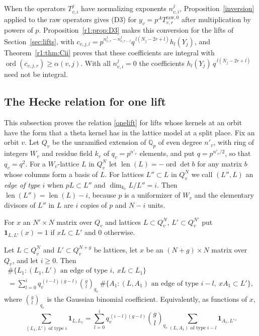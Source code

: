 When the operators $T^j_{v,i}$ have normalizing exponents $n^j_{v,i}$, Proposition~\ref{inversion} applied to the raw operators gives (D3) for $y_v=p^{A}T^{\mathrm{raw},0}_{v,r}$ after multiplication by powers of $p$. Proposition~\ref{r1:prop:D3} makes this conversion for the lifts of Section~\ref{sec:lifts}, with $c_{v,j,l}=p^{n^j_{v,r}-n^j_{v,r-l}}q^{\,l(N_j-2r+l)}h_l(Y_j)$, and Theorem~\ref{r1:thm:Cii} proves that these coefficients are integral with $\operatorname{ord}(c_{v,j,r})\ge\alpha(v,j)$. With all $n^j_{v,i}=0$ the coefficients $h_l(Y_j)\,q^{\,l(N_j-2r+l)}$ need not be integral.

\subsection{The Hecke relation for one lift}\label{sec:onelift}

This subsection proves the relation \eqref{onelift} for lifts whose kernels at an orbit have the form that a theta kernel has in the lattice model at a split place. Fix an orbit $v$. Let $Q_v$ be the unramified extension of $\mathbb Q_p$ of even degree $n'_v$, with ring of integers $W_v$ and residue field $k_v$ of $q_v=p^{n'_v}$ elements, and put $q=p^{n'_v/2}$, so that $q_v=q^2$. For a $W_v$-lattice $L$ in $Q_v^N$ let $\operatorname{len}(L)=-\operatorname{ord}\det b$ for any matrix $b$ whose columns form a basis of $L$. For lattices $L''\subset L$ in $Q_v^N$ we call $(L'',L)$ an \emph{edge of type $i$} when $pL\subset L''$ and $\dim_{k_v}L/L''=i$. Then $\operatorname{len}(L'')=\operatorname{len}(L)-i$, because $p$ is a uniformizer of $W_v$ and the elementary divisors of $L''$ in $L$ are $i$ copies of $p$ and $N-i$ units.

For $x$ an $N'\times N$ matrix over $Q_v$ and lattices $L\subset Q_v^N$, $L'\subset Q_v^{N'}$ put $\mathbf 1_{L,L'}(x)=1$ if $xL\subset L'$ and $0$ otherwise.

\begin{lemma}\label{countloc}
Let $L\subset Q_v^N$ and $L'\subset Q_v^{N+g}$ be lattices, let $x$ be an $(N+g)\times N$ matrix over $Q_v$, and let $i\ge0$. Then
\begin{multline*}
\#\big\{L_1:(L_1,L')\text{ an edge of type }i,\ xL\subset L_1\big\}\\
=\sum_{l=0}^{i}q_v^{\,(i-l)(g-l)}\binom gl_{q_v}\,\#\big\{A_1:(L,A_1)\text{ an edge of type }i-l,\ xA_1\subset L'\big\},
\end{multline*}
where $\binom gl_{q_v}$ is the Gaussian binomial coefficient. Equivalently, as functions of $x$,
\[
\sum_{(L_1,L')\text{ of type }i}\mathbf 1_{L,L_1}=\sum_{l=0}^iq_v^{\,(i-l)(g-l)}\binom gl_{q_v}\sum_{(L,A_1)\text{ of type }i-l}\mathbf 1_{A_1,L'} .
\]
\end{lemma}

